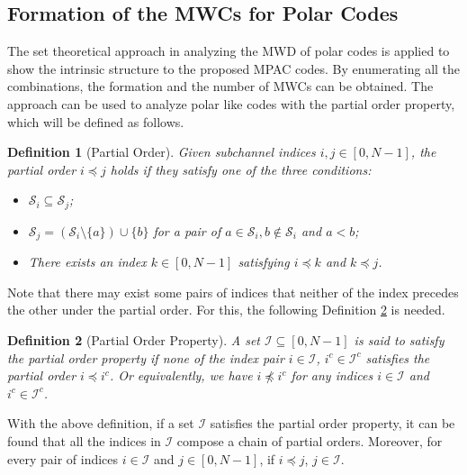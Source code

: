 \documentclass[12pt, draftclsnofoot, peerreview, onecolumn]{IEEEtran}
\theoremstyle{noparent}
\newtheorem{definition}{\textbf{{Definition}}}
\begin{document}
\subsection{Formation of the MWCs for Polar Codes}
\label{Formation_of_the_MWCs_for_Polar_codes}
The set theoretical approach \cite{Rowshan2023FormationMinweight} 
in analyzing the MWD of polar codes is applied to show the intrinsic structure to 
the proposed MPAC codes.
By enumerating all the combinations, 
the formation and the number of MWCs can be obtained.
The approach can be used to analyze polar like codes with the partial order property, which will be defined as follows.

\begin{definition}[Partial Order\cite{Schurch2016}]
    \label{defi_partial_order}
    Given subchannel indices $i,j\in [0,N-1]$,
    the partial order $i \preceq j$ holds if 
    they satisfy one of the three conditions:
    \begin{itemize}
        \item $\mathcal{S}_{i} \subseteq \mathcal{S}_{j}$;
        \item $\mathcal{S}_{j}=(\mathcal{S}_{i}\setminus\{a\})\cup\{b\}$ for a pair of 
        $a\in \mathcal{S}_{i},b\notin\mathcal{S}_{i}$ and $a<b$;
        \item There exists an index $k \in\left[0,N-1\right]$ satisfying $i \preceq k$ and  $k \preceq j$.
    \end{itemize}
\end{definition}


Note that there may exist some pairs of indices
that neither of the index precedes the other under the partial order.
For this, the following Definition \ref{defi_POP} is needed.

\begin{definition}[Partial Order Property\cite{Rowshan2023FormationMinweight}]
    \label{defi_POP}
    A set $\mathcal{I}\subseteq\left[0,N-1\right]$ 
    is said to satisfy the partial order property if 
    none of the index pair $i\in\mathcal{I}$, 
    $i^{c}\in\mathcal{I}^{c}$ satisfies the partial order
    $i \preceq i^{c}$.
    Or equivalently, we have $i \npreceq i^{c}$ for any indices
    $i\in\mathcal{I}$ and $i^{c}\in\mathcal{I}^{c}$.
\end{definition}

With the above definition, if a set $\mathcal{I}$ 
satisfies the partial order property,
it can be found that all the indices in $\mathcal{I}$ 
compose a chain of partial orders. 
Moreover, for every pair of indices $i \in \mathcal{I}$ and $j \in[0, N-1]$, 
if $i \preceq j$, $j \in \mathcal{I}$.
\end{document}
